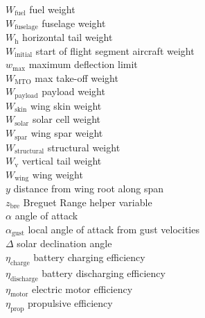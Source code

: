 \begin{tabbing}
$W_{\text{fuel}}$ \> fuel weight \\ %
$W_{\text{fuselage}}$ \> fuselage weight \\ %
$W_{\text{h}}$ \> horizontal tail weight \\ %
$W_{\text{initial}}$ \> start of flight segment aircraft weight \\ %
$w_{\text{max}}$ \> maximum deflection limit \\ %
$W_{\text{MTO}}$\> max take-off weight \\ %
$W_{\text{payload}}$ \> payload weight \\ %
$W_{\text{skin}}$ \> wing skin weight \\ %
$W_{\text{solar}}$ \> solar cell weight \\ %
$W_{\text{spar}}$ \> wing spar weight \\ %
$W_{\text{structural}}$ \> structural weight \\ %
$W_{\text{v}}$ \> vertical tail weight \\ %
$W_{\text{wing}}$ \> wing weight \\ %
$y$ \> distance from wing root along span \\ %
$z_{\text{bre}}$ \> Breguet Range helper variable \\
$\alpha$ \> angle of attack \\
$\alpha_{\text{gust}}$ \> local angle of attack from gust velocities \\ %
$\Delta$ \> solar declination angle \\
$\eta_{\text{charge}}$ \> battery charging efficiency \\
$\eta_{\text{discharge}}$ \> battery discharging efficiency \\
$\eta_{\text{motor}}$ \> electric motor efficiency \\
$\eta_{\text{prop}}$ \> propulsive efficiency \\

\end{tabbing}

